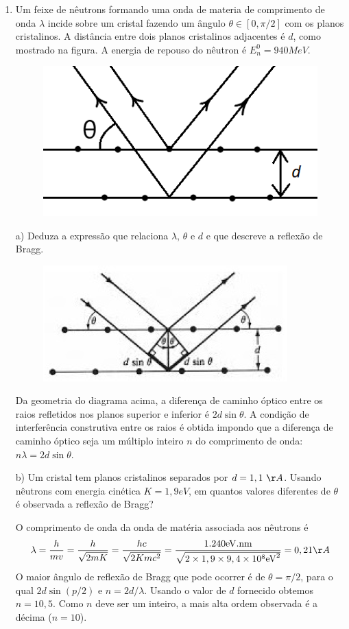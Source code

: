 \begin{enumerate}[start=1,label={\bfseries Q\arabic*.}]
\item Um feixe de nêutrons formando uma onda de materia de comprimento de onda $\lambda$ incide sobre um cristal fazendo um ângulo $\theta \in [0, \pi/2]$ com os planos cristalinos. A distância entre dois planos cristalinos adjacentes é $d$, como mostrado na figura. A energia de repouso do nêutron é $E_{n}^{0} = 940 MeV$.
\begin{figure}[H]
  \centering
  \includegraphics[scale=0.7]{moderna-img/espalha}
\end{figure}


  a) Deduza a expressão que relaciona $\lambda$, $\theta$ e $d$ e que descreve a reflexão de Bragg.

  \resposta
\begin{figure}[H]
  \centering
  \includegraphics[scale=0.7]{moderna-img/espalha1}
\end{figure}
Da geometria do diagrama acima, a diferença de caminho óptico entre os raios refletidos nos planos superior e inferior é $2d \sin \theta$. A condição de interferência construtiva entre os raios é obtida impondo que a diferença de caminho óptico seja um múltiplo inteiro $n$ do comprimento de onda: $n\lambda = 2d \sin \theta$.


b) Um cristal tem planos cristalinos separados por $d = 1,1 \ \AA $. Usando nêutrons com energia cinética $K = 1,9 eV$, em quantos valores diferentes de $\theta$ é observada a reflexão de Bragg?

\resposta  O comprimento de onda da onda de matéria associada aos nêutrons é
$$
 \lambda=\frac{h}{m v}=\frac{h}{\sqrt{2 m K}}=\frac{h c}{\sqrt{2 K m c^{2}}}=\frac{1.240 \mathrm{eV} . \mathrm{nm}}{\sqrt{2 \times 1,9 \times 9,4 \times 10^{8} \mathrm{eV}^{2}}}=0,21 \AA
$$
O maior ângulo de reflexão de Bragg que pode ocorrer é de $\theta = \pi/2$, para o qual $2d \sin(p/2)$ e $n = 2d/\lambda$. Usando o valor de $d$ fornecido obtemos $n = 10,5$. Como $n$ deve ser um inteiro, a mais alta ordem observada é a décima ($n = 10$).




\end{enumerate}
